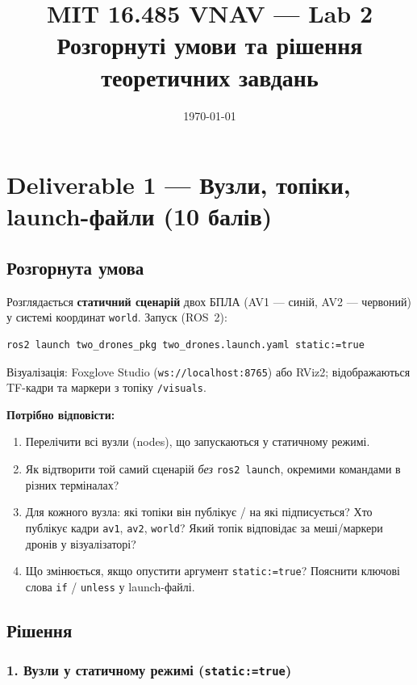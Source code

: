 \documentclass[11pt,a4paper]{article}
\title{MIT 16.485 VNAV --- Lab 2\\[0.5em]
\large Розгорнуті умови та рішення теоретичних завдань}
\author{}
\date{\today}
\begin{document}
\maketitle
\tableofcontents
\newpage

\section{Deliverable 1 --- Вузли, топіки, launch-файли (10 балів)}

\subsection{Розгорнута умова}

Розглядається \textbf{статичний сценарій} двох БПЛА (AV1 --- синій, AV2 --- червоний) у системі координат \texttt{world}.
Запуск (ROS~2):
\begin{verbatim}
ros2 launch two_drones_pkg two_drones.launch.yaml static:=true
\end{verbatim}
Візуалізація: Foxglove Studio (\texttt{ws://localhost:8765}) або RViz2; відображаються TF-кадри та маркери з топіку \texttt{/visuals}.

\textbf{Потрібно відповісти:}
\begin{enumerate}[label=\arabic*.]
  \item Перелічити всі вузли (nodes), що запускаються у статичному режимі.
  \item Як відтворити той самий сценарій \emph{без} \texttt{ros2 launch}, окремими командами в різних терміналах?
  \item Для кожного вузла: які топіки він публікує / на які підписується? Хто публікує кадри \texttt{av1}, \texttt{av2}, \texttt{world}? Який топік відповідає за меші/маркери дронів у візуалізаторі?
  \item Що змінюється, якщо опустити аргумент \texttt{static:=true}? Пояснити ключові слова \texttt{if} / \texttt{unless} у launch-файлі.
\end{enumerate}

\subsection{Рішення}

\subsubsection*{1. Вузли у статичному режимі (\texttt{static:=true})}
\end{document}
